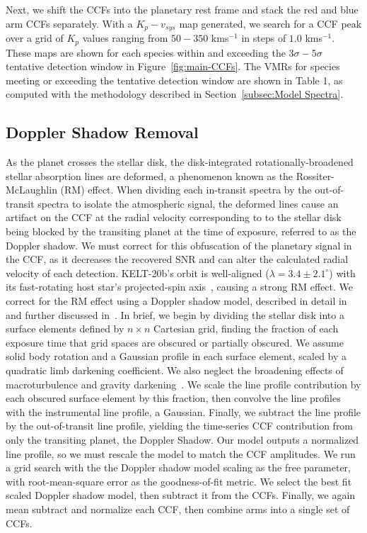 \documentclass[twocolumn]{aastex631}
\begin{document}
            Next, we shift the CCFs into the planetary rest frame and stack the red and blue arm CCFs separately. With a ${K_p-v_{sys}}$ map generated, we search for a CCF peak over a grid of $K_p$ values ranging from $50-350$ kms$^{-1}$ in steps of $1.0$ kms$^{-1}$. These maps are shown for each species within and exceeding the ${3\sigma}-{5\sigma}$ tentative detection window in Figure~\ref{fig:main-CCFs}. The VMRs for species meeting or exceeding the tentative detection window are shown in Table 1, as computed with the methodology described in Section~\ref{subsec:Model Spectra}.

        \subsection{Doppler Shadow Removal}
            As the planet crosses the stellar disk, the disk-integrated rotationally-broadened stellar absorption lines are deformed, a phenomenon known as the Rossiter-McLaughlin (RM) effect. When dividing each in-transit spectra by the out-of-transit spectra to isolate the atmospheric signal, the deformed lines cause an artifact on the CCF at the radial velocity corresponding to to the stellar disk being blocked by the transiting planet at the time of exposure, referred to as the Doppler shadow. We must correct for this obfuscation of the planetary signal in the CCF, as it decreases the recovered SNR and can alter the calculated radial velocity of each detection. KELT-20b's orbit is well-aligned ($\lambda = 3.4 \pm 2.1 ^{\circ}$) with its fast-rotating host star's projected-spin axis~\citep{Lund2017}, causing a strong RM effect. We correct for the RM effect using a Doppler shadow model, described in detail in~\citep{Johnson2016} and further discussed in~\citep{Johnson2014, Johnson2017}. In brief, we begin by dividing the stellar disk into a surface elements defined by $n \times n$ Cartesian grid, finding the fraction of each exposure time that grid spaces are obscured or partially obscured. We assume solid body rotation and a Gaussian profile in each surface element, scaled by a quadratic limb darkening coefficient. We also neglect the broadening effects of macroturbulence and gravity darkening~\citet{Johnson2016}. We scale the line profile contribution by each obscured surface element by this fraction, then convolve the line profiles with the instrumental line profile, a Gaussian. Finally, we subtract the line profile by the out-of-transit line profile, yielding the time-series CCF contribution from only the transiting planet, the Doppler Shadow. Our model outputs a normalized line profile, so we must rescale the model to match the CCF amplitudes. We run a grid search with the the Doppler shadow model scaling as the free parameter, with root-mean-square error as the goodness-of-fit metric. We select the best fit scaled Doppler shadow model, then subtract it from the CCFs. Finally, we again mean subtract and normalize each CCF, then combine arms into a single set of CCFs.
            
\end{document}
